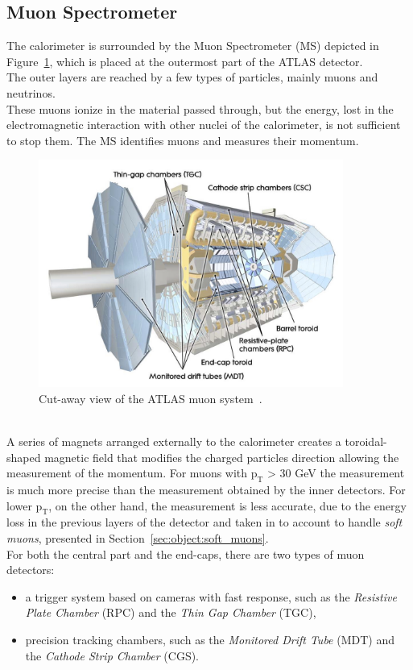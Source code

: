 \subsection{Muon Spectrometer}
\label{sec:MuonSpec}
The calorimeter is surrounded by the Muon Spectrometer (MS) depicted in Figure~\ref{fig:MS}, which is placed at the outermost part of the ATLAS detector.\\
The outer layers are reached by a few types of particles, mainly muons and neutrinos.\\
These muons ionize  in the material passed through, but the energy, lost in the electromagnetic interaction
with other nuclei of the calorimeter, is not sufficient to stop them. 
The MS  identifies muons and measures their momentum.
\begin{figure}[h]
	\centering
	\includegraphics[width=10cm]{Chapters/CH2/figures/MS}
	\caption{Cut-away view of the ATLAS muon system~\cite{ATLAS}.}
	\label{fig:MS}
\end{figure}
\\A series of magnets arranged externally to the calorimeter creates a toroidal-shaped magnetic field that modifies the charged particles direction allowing the measurement of the momentum.
For muons with $\mathrm{p_T}$ > 30 GeV the measurement is much more precise than the measurement obtained by the inner detectors. 
For lower $\mathrm{p_T}$, on the other hand, the measurement is less accurate, due to the 
energy loss in the previous layers of the detector and taken in to account to handle \textit{soft muons}, presented in Section~\ref{sec:object:soft_muons}.\\
For both the central part and the end-caps,  there are two types of muon detectors:
\begin{itemize}
	\item a trigger system based on cameras with fast response, such as the \textit{Resistive Plate Chamber} (RPC) and the \textit{Thin Gap Chamber} (TGC), 
	\item precision tracking chambers, such as the \textit{Monitored Drift Tube} (MDT) and the \textit{Cathode Strip Chamber} (CGS).
\end{itemize}
